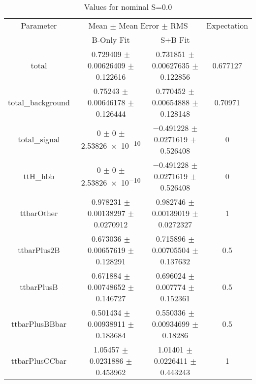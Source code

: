 \begin{table}
\centering
\caption{Values for nominal S=0.0}
\begin{tabular}{cccc}
\toprule
Parameter & \multicolumn{2}{c}{Mean $\pm$ Mean Error $\pm$ RMS} & Expectation\\
 & B-Only Fit & S+B Fit & \\
\midrule
total & \num{0.729409} $\pm$ \num{0.00626409} $\pm$ \num{0.122616} & \num{0.731851} $\pm$ \num{0.00627635} $\pm$ \num{0.122856} & \num{0.677127}\\
total\_background & \num{0.75243} $\pm$ \num{0.00646178} $\pm$ \num{0.126444} & \num{0.770452} $\pm$ \num{0.00654888} $\pm$ \num{0.128148} & \num{0.70971}\\
total\_signal & \num{0} $\pm$ \num{0} $\pm$ \num{2.53826e-10} & \num{-0.491228} $\pm$ \num{0.0271619} $\pm$ \num{0.526408} & \num{0}\\
ttH\_hbb & \num{0} $\pm$ \num{0} $\pm$ \num{2.53826e-10} & \num{-0.491228} $\pm$ \num{0.0271619} $\pm$ \num{0.526408} & \num{0}\\
ttbarOther & \num{0.978231} $\pm$ \num{0.00138297} $\pm$ \num{0.0270912} & \num{0.982746} $\pm$ \num{0.00139019} $\pm$ \num{0.0272327} & \num{1}\\
ttbarPlus2B & \num{0.673036} $\pm$ \num{0.00657619} $\pm$ \num{0.128291} & \num{0.715896} $\pm$ \num{0.00705504} $\pm$ \num{0.137632} & \num{0.5}\\
ttbarPlusB & \num{0.671884} $\pm$ \num{0.00748652} $\pm$ \num{0.146727} & \num{0.696024} $\pm$ \num{0.007774} $\pm$ \num{0.152361} & \num{0.5}\\
ttbarPlusBBbar & \num{0.501434} $\pm$ \num{0.00938911} $\pm$ \num{0.183684} & \num{0.550336} $\pm$ \num{0.00934699} $\pm$ \num{0.18286} & \num{0.5}\\
ttbarPlusCCbar & \num{1.05457} $\pm$ \num{0.0231886} $\pm$ \num{0.453962} & \num{1.01401} $\pm$ \num{0.0226411} $\pm$ \num{0.443243} & \num{1}\\
\bottomrule
\end{tabular}
\end{table}